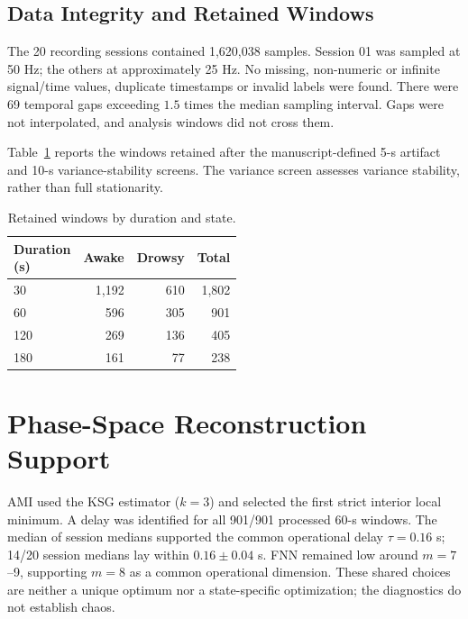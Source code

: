 \documentclass[conference,a4paper]{IEEEtran}
\begin{document}
\subsection{Data Integrity and Retained Windows}

The 20 recording sessions contained 1,620,038 samples. Session 01 was sampled at 50 Hz; the others at approximately 25 Hz. No missing, non-numeric or infinite signal/time values, duplicate timestamps or invalid labels were found. There were 69 temporal gaps exceeding $1.5$ times the median sampling interval. Gaps were not interpolated, and analysis windows did not cross them.

Table~\ref{tab:supp_retained} reports the windows retained after the manuscript-defined 5-s artifact and 10-s variance-stability screens. The variance screen assesses variance stability, rather than full stationarity.

\begin{table}[!htbp]
\centering
\caption{Retained windows by duration and state.}
\label{tab:supp_retained}
\footnotesize
\setlength{\tabcolsep}{3pt}
\renewcommand{\arraystretch}{1.05}
\begin{tabular*}{\linewidth}{@{\extracolsep{\fill}}lrrr@{}}
\toprule
\makecell{Duration\\(s)} & Awake & Drowsy & Total\\
\midrule
30  & 1,192 & 610 & 1,802\\
60  & 596   & 305 & 901\\
120 & 269   & 136 & 405\\
180 & 161   & 77  & 238\\
\bottomrule
\end{tabular*}
\end{table}


\section{Phase-Space Reconstruction Support}
\label{sec:supp_2}

AMI used the KSG estimator ($k=3$) and selected the first strict interior local minimum. A delay was identified for all 901/901 processed 60-s windows. The median of session medians supported the common operational delay $\tau=0.16$ s; 14/20 session medians lay within $0.16\pm0.04$ s. FNN remained low around $m=7$--9, supporting $m=8$ as a common operational dimension. These shared choices are neither a unique optimum nor a state-specific optimization; the diagnostics do not establish chaos.
\end{document}

